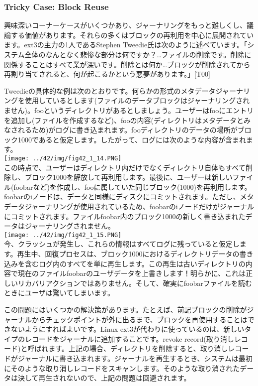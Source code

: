 \hypertarget{tricky-case-block-reuse}{%
\subsubsection*{Tricky Case: Block Reuse}\label{tricky-case-block-reuse}}

興味深いコーナーケースがいくつかあり、ジャーナリングをもっと難しくし、議論する価値があります。それらの多くはブロックの再利用を中心に展開されています。ext3の主力の1人であるStephen
Tweedie氏は次のように述べています。「システム全体のなんとなく悲惨な部分は何ですか？\ldots ファイルの削除です。削除に関係することはすべて業が深いです。削除とは何か\ldots ブロックが削除されてから再割り当てされると、何が起こるかという悪夢があります。」{[}T00{]}

Tweedieの具体的な例は次のとおりです。何らかの形式のメタデータジャーナリングを使用しているとします(ファイルのデータブロックはジャーナリングされません)。fooというディレクトリがあるとしましょう。ユーザーはfooにエントリを追加し(ファイルを作成するなど)、fooの内容(ディレクトリはメタデータとみなされるため)がログに書き込まれます。fooディレクトリのデータの場所がブロック1000であると仮定します。したがって、ログには次のような内容が含まれます。\\
\texttt{[image: ../42/img/fig42\_1\_14.PNG]}\\
この時点で、ユーザーはディレクトリ内だけでなくディレクトリ自体もすべて削除し、ブロック1000を解放して再利用します。最後に、ユーザーは新しいファイル(foobarなど)を作成し、fooに属していた同じブロック(1000)を再利用します。foobarのiノードは、データと同様にディスクにコミットされます。ただし、メタデータジャーナリングが使用されているため、foobarのiノードだけがジャーナルにコミットされます。ファイルfoobar内のブロック1000の新しく書き込まれたデータはジャーナリングされません。\\
\texttt{[image: ../42/img/fig42\_1\_15.PNG]}\\
今、クラッシュが発生し、これらの情報はすべてログに残っていると仮定します。再生中、回復プロセスは、ブロック1000におけるディレクトリデータの書き込みを含むログ内のすべてを単に再生します。この再生は古いディレクトリの内容で現在のファイルfoobarのユーザデータを上書きします！明らかに、これは正しいリカバリアクションではありません。そして、確実にfoobarファイルを読むときにユーザは驚いてしまいます。

この問題にはいくつかの解決策があります。たとえば、前記ブロックの削除がジャーナルからチェックポイントが外に出るまで、ブロックを再使用することはできないようにすればよいです。Linux
ext3が代わりに使っているのは、新しいタイプのレコードをジャーナルに追加することです。revoke
record(取り消しレコード)と呼ばれます。上記の場合、ディレクトリを削除すると、取り消しレコードがジャーナルに書き込まれます。ジャーナルを再生するとき、システムは最初にそのような取り消しレコードをスキャンします。そのような取り消されたデータは決して再生されないので、上記の問題は回避されます。

